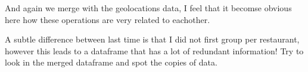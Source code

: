 \documentclass[letterpaper,10pt,english]{jupyterBook}
\begin{document}
\sphinxAtStartPar
And again we merge with the geolocations data, I feel that it becomse obvious here how these operations are very related to eachother.

\begin{sphinxVerbatim}[commandchars=\\\{\}]
  
\end{sphinxVerbatim}

\sphinxAtStartPar
A subtle difference between last time is that I did not first group per restaurant, however this leads to a dataframe that has a lot of redundant information!
Try to look in the merged dataframe and spot the copies of data.

\begin{sphinxVerbatim}[commandchars=\\\{\}]
    
\end{sphinxVerbatim}
\end{document}
